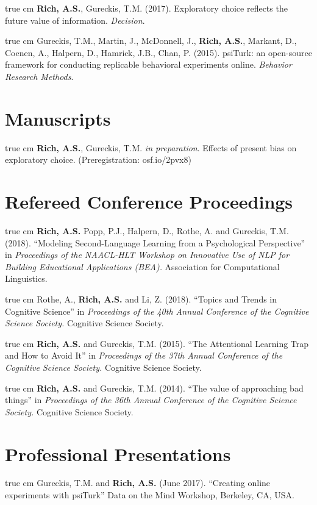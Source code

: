 \documentclass[12pt]{my_cv}
\def\ind{\hangindent=1 true cm\hangafter=1 \noindent}
\begin{document}
\ind \textbf{Rich, A.S.}, Gureckis, T.M. (2017). Exploratory choice
reflects the future value of information. \emph{Decision}.

\ind Gureckis, T.M., Martin, J., McDonnell, J., \textbf{Rich, A.S.}, Markant,
D., Coenen, A., Halpern, D., Hamrick, J.B., Chan, P. (2015). psiTurk: an
open-source framework for conducting replicable behavioral experiments online.
\emph{Behavior Research Methods}.

\section{Manuscripts}

\ind \textbf{Rich, A.S.}, Gureckis, T.M. \emph{in preparation}. Effects of
present bias on exploratory choice. (Preregistration: osf.io/2pvx8)

\section{Refereed Conference Proceedings}

\ind \textbf{Rich, A.S.} Popp, P.J., Halpern, D., Rothe, A. and Gureckis, T.M.
(2018). ``Modeling Second-Language Learning from a Psychological Perspective''
in \emph{Proceedings of the NAACL-HLT Workshop on Innovative Use of NLP for
  Building Educational Applications (BEA).} Association for Computational Linguistics.	

\ind Rothe, A., \textbf{Rich, A.S.} and Li, Z. (2018). ``Topics and Trends in Cognitive Science'' in \emph{Proceedings of the 40th Annual Conference of the Cognitive Science Society.} Cognitive Science Society.	

\ind \textbf{Rich, A.S.} and Gureckis, T.M. (2015). ``The Attentional Learning Trap and How to Avoid It'' in \emph{Proceedings of the 37th Annual Conference of the Cognitive Science Society.}  Cognitive Science Society.	

\ind \textbf{Rich, A.S.} and Gureckis, T.M. (2014). ``The value of approaching bad things'' in \emph{Proceedings of the 36th Annual Conference of the Cognitive Science Society.} Cognitive Science Society.	

\section{Professional Presentations}

\ind Gureckis, T.M. and \textbf{Rich, A.S.} (June 2017). ``Creating online
experiments with psiTurk'' Data on the Mind Workshop, Berkeley, CA, USA.
\end{document}
